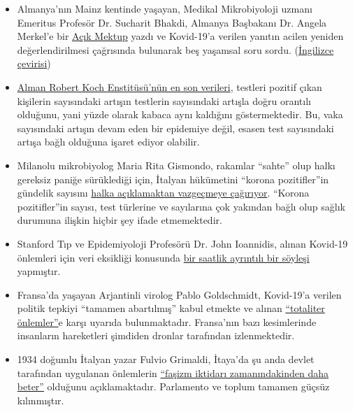 \begin{itemize}
\tightlist
\item
  Almanya'nın Mainz kentinde yaşayan, Medikal Mikrobiyoloji uzmanı
  Emeritus Profesör Dr. Sucharit Bhakdi, Almanya Başbakanı Dr. Angela
  Merkel'e bir
  \href{https://swprs.org/offener-brief-von-professor-sucharit-bhakdi-an-bundeskanzlerin-dr-angela-merkel/}{Açık
  Mektup} yazdı ve Kovid-19'a verilen yanıtın acilen yeniden
  değerlendirilmesi çağrısında bulunarak beş yaşamsal soru sordu.
  (\href{https://swprs.org/open-letter-from-professor-sucharit-bhakdi-to-german-chancellor-dr-angela-merkel/}{İngilizce
  çevirisi})
\item
  \href{https://multipolar-magazin.de/artikel/coronavirus-irrefuhrung-fallzahlen}{Alman
  Robert Koch Enstitüsü'nün en son verileri}, testleri pozitif çıkan
  kişilerin sayısındaki artışın testlerin sayısındaki artışla doğru
  orantılı olduğunu, yani yüzde olarak kabaca aynı kaldığını
  göstermektedir. Bu, vaka sayısındaki artışın devam eden bir epidemiye
  değil, esasen test sayısındaki artışa bağlı olduğuna işaret ediyor
  olabilir.
\item
  Milanolu mikrobiyolog Maria Rita Gismondo, rakamlar ``sahte'' olup
  halkı gereksiz paniğe sürüklediği için, İtalyan hükümetini ``korona
  pozitifler''in gündelik sayısını
  \href{https://www.secoloditalia.it/2020/03/coronavirus-la-gismondo-ammonisce-duramente-basta-snocciolare-numeri-sui-positivi-sono-dati-falsati/}{halka
  açıklamaktan vazgeçmeye çağırıyor}. ``Korona pozitifler''in sayısı,
  test türlerine ve sayılarına çok yakından bağlı olup sağlık durumuna
  ilişkin hiçbir şey ifade etmemektedir.
\item
  Stanford Tıp ve Epidemiyoloji Profesörü Dr. John Ioannidis, alınan
  Kovid-19 önlemleri için veri eksikliği konusunda
  \href{https://www.youtube.com/watch?v=d6MZy-2fcBw}{bir saatlik
  ayrıntılı bir söyleşi} yapmıştır.
\item
  Fransa'da yaşayan Arjantinli virolog Pablo Goldschmidt, Kovid-19'a
  verilen politik tepkiyi ``tamamen abartılmış'' kabul etmekte ve alınan
  \href{https://www.infobae.com/coronavirus/2020/03/28/para-un-prestigioso-cientifico-argentino-el-coronavirus-no-merece-que-el-planeta-este-en-un-estado-de-parate-total/}{``totaliter
  önlemler''}e karşı uyarıda bulunmaktadır. Fransa'nın bazı kesimlerinde
  insanların hareketleri şimdiden dronlar tarafından izlenmektedir.
\item
  1934 doğumlu İtalyan yazar Fulvio Grimaldi, İtaya'da şu anda devlet
  tarafından uygulanan önlemlerin
  \href{https://www.youtube.com/watch?v=O3BuNp01vpc}{``faşizm iktidarı
  zamanındakinden daha beter''} olduğunu açıklamaktadır. Parlamento ve
  toplum tamamen güçsüz kılınmıştır.
\end{itemize}

